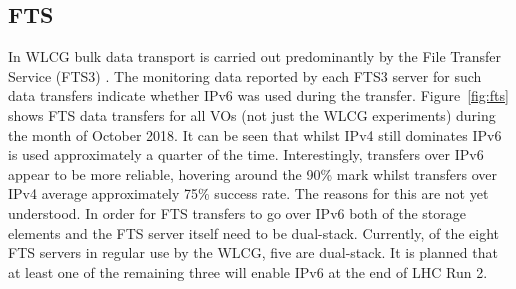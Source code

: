 \subsection{FTS}

In WLCG bulk data transport is carried out predominantly by the File Transfer Service (FTS3)  \cite{638647551}. The monitoring data reported by each FTS3 server for such data transfers indicate whether IPv6 was used during the transfer. Figure~\ref{fig:fts} shows FTS data transfers 
for all VOs (not just the WLCG experiments) during the month of October 2018. It can be seen that whilst IPv4 still dominates IPv6 is used approximately a quarter of the time. Interestingly, transfers over IPv6 appear to be more reliable, hovering around the 90\% mark whilst transfers over IPv4 average approximately 75\% success rate. The reasons for this are not yet understood.
In order for FTS transfers to go over IPv6 both of the storage elements and the FTS server itself need to be dual-stack. Currently, of the eight FTS servers in regular use by the WLCG, five are dual-stack. It is planned that at least one of the remaining three will enable IPv6 at the end of LHC Run 2.

